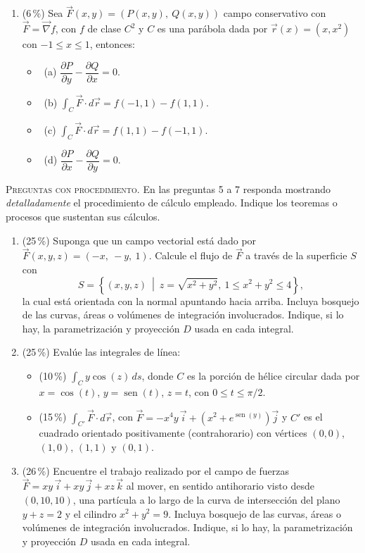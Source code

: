 \documentclass[11pt]{article}
\begin{document}
\begin{enumerate}
\item{} (6\,\%) Sea $\vec F(x,y) = (P(x,y),\ Q(x,y))$ campo conservativo con $\vec F = \vec\nabla f$, con $f$ de clase $C^2$ y $C$ es una parábola dada por $\vec r(x) = (x, x^2)$ con $-1 \leq x \leq 1$, entonces:
\begin{itemize}
\item[] \fbox{\phantom{x}}\ (a) $\dfrac{\partial P}{\partial y} - \dfrac{\partial Q}{\partial x} = 0$.
\item[] \fbox{\phantom{x}}\ (b) $\displaystyle \int_C \vec F \cdot d\vec r = f(-1,1) - f(1,1)$.
\item[] \fbox{\phantom{x}}\ (c) $\displaystyle \int_C \vec F \cdot d\vec r = f(1,1) - f(-1,1)$.
\item[] \fbox{\phantom{x}}\ (d) $\dfrac{\partial P}{\partial x} - \dfrac{\partial Q}{\partial y} = 0$.
\end{itemize}
\end{enumerate}

\vspace{4pt}
\noindent\textsc{Preguntas con procedimiento.} En las preguntas 5 a 7 responda mostrando \textit{detalladamente} el procedimiento de cálculo empleado. Indique los teoremas o procesos que sustentan sus cálculos.

\begin{enumerate}[start=5]
\item{} (25\,\%) Suponga que un campo vectorial está dado por $\vec F(x,y,z) = (-x,\ -y,\ 1)$. Calcule el flujo de $\vec F$ a través de la superficie $S$ con
\[
S = \left\{(x,y,z)\ \middle|\ z = \sqrt{x^2+y^2},\ 1 \leq x^2+y^2 \leq 4\right\},
\]
la cual está orientada con la normal apuntando hacia arriba. Incluya bosquejo de las curvas, áreas o volúmenes de integración involucrados. Indique, si lo hay, la parametrización y proyección $D$ usada en cada integral.

\item{} (25\,\%) Evalúe las integrales de línea:
\begin{itemize}
\item[(a)] (10\,\%) $\displaystyle \int_C y\cos(z)\,ds$, donde $C$ es la porción de hélice circular dada por $x = \cos(t)$, $y = \operatorname{sen}(t)$, $z = t$, con $0 \leq t \leq \pi/2$.
\item[(b)] (15\,\%) $\displaystyle \int_{C'} \vec F \cdot d\vec r$, con $\vec F = -x^4y\,\vec i + \left(x^2 + e^{\operatorname{sen}(y)}\right)\vec j$ y $C'$ es el cuadrado orientado positivamente (contrahorario) con vértices $(0,0)$, $(1,0)$, $(1,1)$ y $(0,1)$.
\end{itemize}

\item{} (26\,\%) Encuentre el trabajo realizado por el campo de fuerzas $\vec F = xy\,\vec i + xy\,\vec j + xz\,\vec k$ al mover, en sentido antihorario visto desde $(0, 10, 10)$, una partícula a lo largo de la curva de intersección del plano $y + z = 2$ y el cilindro $x^2 + y^2 = 9$. Incluya bosquejo de las curvas, áreas o volúmenes de integración involucrados. Indique, si lo hay, la parametrización y proyección $D$ usada en cada integral.
\end{enumerate}

\examfooter
\end{document}
